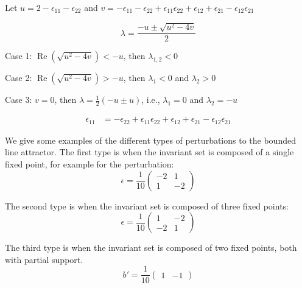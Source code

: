 \documentclass{article} %
\newcounter{ct}
\theoremstyle{definition}
\theoremstyle{remark}
\begin{document}
Let 
$u=2-\epsilon_{11}-\epsilon_{22}$
and 
$v=-\epsilon_{11}-\epsilon_{22}+\epsilon_{11}\epsilon_{22} + \epsilon_{12} + \epsilon_{21} - \epsilon_{12}\epsilon_{21}$

\begin{equation}
\lambda = \frac{-u \pm \sqrt{u^2-4v}}{2}
\end{equation}



Case 1: $\operatorname{Re}(\sqrt{u^2-4v})<-u$, then 
$\lambda_{1,2}<0$


Case 2:  $\operatorname{Re}(\sqrt{u^2-4v})>-u$, then 
$\lambda_{1}<0$ and $\lambda_{2}>0$


Case 3: $v=0$, then 
$\lambda=\tfrac{1}{2}(-u\pm u)$, i.e.,
$\lambda_1=0$ and  $\lambda_2=-u$

\begin{align}
\epsilon_{11} &= -\epsilon_{22}+\epsilon_{11}\epsilon_{22} + \epsilon_{12} + \epsilon_{21} - \epsilon_{12}\epsilon_{21}
\end{align}



We give some examples of the different types of perturbations to the bounded line attractor.
The first type is when the invariant set is composed of a single fixed point, for example for the perturbation:
\begin{equation}
\epsilon = \frac{1}{10}
\begin{pmatrix}
-2  &  1 \\
 1   &  -2
\end{pmatrix}
\end{equation}



The second type is when the invariant set is composed of three fixed points:
\begin{equation}
\epsilon = \frac{1}{10}
\begin{pmatrix}
1  &  -2 \\
 -2  &  1
\end{pmatrix}
\end{equation}

The third type is when the invariant set is composed of two fixed points, both with partial support.
\begin{equation}
b' =  \frac{1}{10}
\begin{pmatrix}
1 & -1
\end{pmatrix}
\end{equation}
\end{document}
